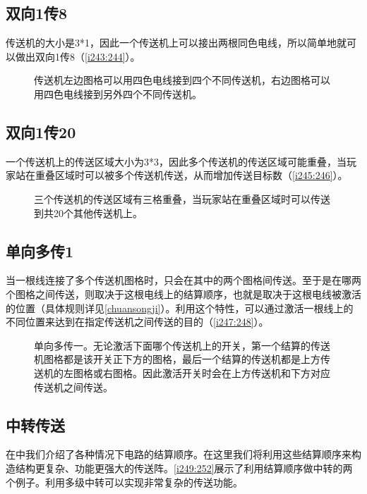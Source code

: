 \subsection{双向1传8}\label{sec11}
传送机的大小是3*1，因此一个传送机上可以接出两根同色电线，所以简单地就可以做出双向1传8（\autoref{i243:244}）。

\begin{figure}[!ht]
  \centering
  \caption{传送机左边图格可以用四色电线接到四个不同传送机，右边图格可以用四色电线接到另外四个不同传送机。}
  \label{i243:244}
\end{figure}

\subsection{双向1传20}\label{sec12}
一个传送机上的传送区域大小为3*3，因此多个传送机的传送区域可能重叠，当玩家站在重叠区域时可以被多个传送机传送，从而增加传送目标数（\autoref{i245:246}）。

\begin{figure}[!ht]
  \centering
  \caption{三个传送机的传送区域有三格重叠，当玩家站在重叠区域时可以传送到共20个其他传送机上。}
  \label{i245:246}
\end{figure}

\subsection{单向多传1}\label{sec13}
当一根线连接了多个传送机图格时，只会在其中的两个图格间传送。至于是在哪两个图格之间传送，则取决于这根电线上的结算顺序，也就是取决于这根电线被激活的位置（具体规则详见\autoref{chuansongji}）。利用这个特性，可以通过激活一根线上的不同位置来达到在指定传送机之间传送的目的（\autoref{i247:248}）。

\begin{figure}[!ht]
  \centering
  \caption{单向多传一。无论激活下面哪个传送机上的开关，第一个结算的传送机图格都是该开关正下方的图格，最后一个结算的传送机都是上方传送机的左图格或右图格。因此激活开关时会在上方传送机和下方对应传送机之间传送。}
  \label{i247:248}
\end{figure}

\subsection{中转传送}
在中我们介绍了各种情况下电路的结算顺序。在这里我们将利用这些结算顺序来构造结构更复杂、功能更强大的传送阵。\autoref{i249:252}展示了利用结算顺序做中转的两个例子。利用多级中转可以实现非常复杂的传送功能。

